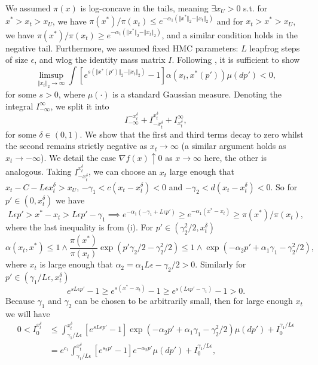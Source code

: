 \documentclass{article}
\begin{document}
We assumed $\pi(x)$ is log-concave in the tails, meaning $\exists x_{U}>0$
s.t. for $x^{*}>x_{t}>x_{U}$, we have $\pi(x^{*})/\pi(x_{t})\leq e^{-\alpha_{1}(\Vert x^{*}\Vert_{2}-\Vert x_{t}\Vert_{2})}$
and for $x_{t}>x^{*}>x_{U}$, we have $\pi(x^{*})/\pi(x_{t})\geq e^{-\alpha_{1}(\Vert x^{*}\Vert_{2}-\Vert x_{t}\Vert_{2})}$,
and a similar condition holds in the negative tail. Furthermore, we
assumed fixed HMC parameters: $L$ leapfrog steps of size $\epsilon$,
and wlog the identity mass matrix $I$. Following \cite{roberts1996geometric,mengersen1996rates},
it is sufficient to show 
\[
\limsup_{\Vert x_{t}\Vert_{2}\to\infty}\int\left[e^{s(\Vert x^{*}(p')\Vert_{2}-\Vert x_{t}\Vert_{2})}-1\right]\alpha(x_{t},x^{*}(p'))\mu(dp')<0,
\]
for some $s>0$, where $\mu(\cdot)$ is a standard Gaussian measure.
Denoting the integral $I_{-\infty}^{\infty}$, we split it into 
\[
I_{-\infty}^{-x_{t}^{\delta}}+I_{-x_{t}^{\delta}}^{x_{t}^{\delta}}+I_{x_{t}^{\delta}}^{\infty},
\]
for some $\delta\in(0,1)$. We show that the first and third terms
decay to zero whilst the second remains strictly negative as $x_{t}\to\infty$
(a similar argument holds as $x_{t}\to-\infty$). We detail the case
$\nabla f(x)\uparrow0$ as $x\to\infty$ here, the other is analogous.
Taking $I_{-x_{t}^{\delta}}^{x_{t}^{\delta}}$, we can choose an $x_{t}$
large enough that $x_{t}-C-L\epsilon x_{t}^{\delta}>x_{U}$, $-\gamma_{1}<c(x_{t}-x_{t}^{\delta})<0$
and $-\gamma_{2}<d(x_{t}-x_{t}^{\delta})<0$. So for $p'\in(0,x_{t}^{\delta})$
we have 
\[
L\epsilon p'>x^{*}-x_{t}>L\epsilon p'-\gamma_{1}\implies e^{-\alpha_{1}(-\gamma_{1}+L\epsilon p')}\geq e^{-\alpha_{1}(x^{*}-x_{t})}\geq\pi(x^{*})/\pi(x_{t}),
\]
where the last inequality is from (i). For $p'\in(\gamma_{2}^{2}/2,x_{t}^{\delta})$
\[
\alpha(x_{t},x^{*})\leq1\wedge\frac{\pi(x^{*})}{\pi(x_{t})}\exp\left(p'\gamma_{2}/2-\gamma_{2}^{2}/2\right)\leq1\wedge\exp\left(-\alpha_{2}p'+\alpha_{1}\gamma_{1}-\gamma_{2}^{2}/2\right),
\]
where $x_{t}$ is large enough that $\alpha_{2}=\alpha_{1}L\epsilon-\gamma_{2}/2>0$.
Similarly for $p'\in(\gamma_{1}/L\epsilon,x_{t}^{\delta})$ 
\[
e^{sL\epsilon p'}-1\geq e^{s(x^{*}-x_{t})}-1\geq e^{s(L\epsilon p'-\gamma_{1})}-1>0.
\]
Because $\gamma_{1}$ and $\gamma_{2}$ can be chosen to be arbitrarily
small, then for large enough $x_{t}$ we will have 
\begin{align}
0<I_{0}^{x_{t}^{\delta}} & \leq\int_{\gamma_{1}/L\epsilon}^{x_{t}^{\delta}}[e^{sL\epsilon p'}-1]\exp\left(-\alpha_{2}p'+\alpha_{1}\gamma_{1}-\gamma_{2}^{2}/2\right)\mu(dp')+I_{0}^{\gamma_{1}/L\epsilon}\nonumber \\
 & =e^{c_{1}}\int_{\gamma_{1}/L\epsilon}^{x_{t}^{\delta}}[e^{s_{2}p'}-1]e^{-\alpha_{2}p'}\mu(dp')+I_{0}^{\gamma_{1}/L\epsilon},\label{eqn1}
\end{align}
\end{document}
